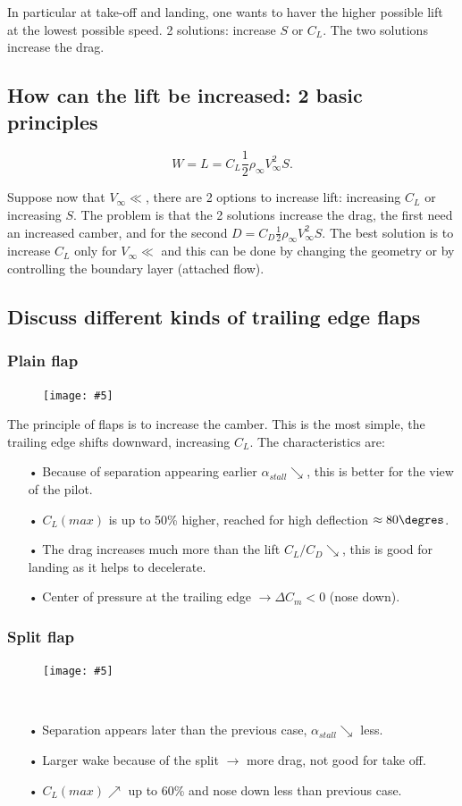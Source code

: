 \documentclass[british,french,11pt, a4paper, openany]{article}
\newcommand{\wrapfig}[6]{%
	\begin{figure}%
		\vspace{-5mm}%
		\texttt{[image: \#5]}%
		\captionof{figure}{}%
		\label{#6}%
	\end{figure}%
}
\begin{document}
In particular at take-off and landing, one wants to haver the higher possible lift at the lowest possible speed. 2 solutions: increase $S$ or $C_L$. The two solutions increase the drag.

\subsection{How can the lift be increased: 2 basic principles}

\begin{equation}
W = L = C_L \frac{1}{2} \rho _\infty V_\infty ^2 S.
\end{equation}

Suppose now that $V_\infty \ll$, there are 2 options to increase lift: increasing $C_L$ or increasing $S$. The problem is that the 2 solutions increase the drag, the first need an increased camber, and for the second $D = C_D \frac{1}{2} \rho _\infty V_\infty ^2 S$. The best solution is to increase $C_L$ only for $V_\infty \ll$ and this can be done by changing the geometry or by controlling the boundary layer (attached flow). 

\subsection{Discuss different kinds of trailing edge flaps}

\subsubsection{Plain flap}
\wrapfig{4}{r}{5}{0.1}{ch5/1}{ch5/1}
The principle of flaps is to increase the camber. This is the most simple, the trailing edge shifts downward, increasing $C_L$. The characteristics are: 
\begin{itemize}
	\item[•] Because of separation appearing earlier $\alpha _{stall} \searrow$, this is better for the view of the pilot. 
	\item[•] $C_L(max)$ is up to 50\% higher, reached for high deflection $\approx 80\degres$.
	\item[•] The drag increases much more than the lift $C_L/C_D \searrow$, this is good for landing as it helps to decelerate.
	\item[•] Center of pressure at the trailing edge $\rightarrow \Delta C_m<0$ (nose down). 
\end{itemize}

\subsubsection{Split flap}
\wrapfig{3}{r}{3}{0.15}{ch5/2}{ch5/2} \ \\
\begin{itemize}
	\item[•] Separation appears later than the previous case, $\alpha _{stall} \searrow$ less. 
	\item[•] Larger wake because of the split $\rightarrow$ more drag, not good for take off. 
	\item[•] $C_L(max) \nearrow$ up to 60\% and nose down less than previous case. 
\end{itemize}
\end{document}
